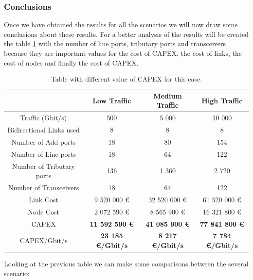 \vspace{13pt}
\subsubsection{Conclusions}

Once we have obtained the results for all the scenarios we will now draw some conclusions about these results. For a better analysis of the results will be created the table \ref{table_comparative_transl_surv_heuristic} with the number of line ports, tributary ports and transceivers because they are important values for the cost of CAPEX, the cost of links, the cost of nodes and finally the cost of CAPEX.\\

\begin{table}[H]
\centering
\begin{tabular}{| c | c | c | c |}
 \hline
   & Low Traffic & Medium Traffic  & High Traffic \\
 \hline\hline
 Traffic (Gbit/s) & 500 & 5 000 & 10 000 \\ \hline
 Bidirectional Links used & 8 & 8 & 8 \\ \hline
 Number of Add ports & 18 & 80 & 154 \\ \hline
 Number of Line ports & 18 & 64 & 122 \\ \hline
 Number of Tributary ports & 136 & 1 360 & 2 720 \\ \hline
 Number of Transceivers & 18 & 64 & 122 \\ \hline
 Link Cost & 9 520 000 \euro & 32 520 000 \euro & 61 520 000 \euro \\ \hline
 Node Cost & 2 072 590 \euro & 8 565 900 \euro & 16 321 800 \euro \\ \hline
 CAPEX & \textbf{11 592 590 \euro} & \textbf{41 085 900 \euro} & \textbf{77 841 800 \euro} \\ \hline
 CAPEX/Gbit/s & \textbf{23 185 \euro/Gbit/s} & \textbf{8 217 \euro/Gbit/s} & \textbf{7 784 \euro/Gbit/s} \\ \hline
\end{tabular}
\caption{Table with different value of CAPEX for this case.}
\label{table_comparative_transl_surv_heuristic}
\end{table}

\noindent
Looking at the previous table we can make some comparisons between the several scenario:

